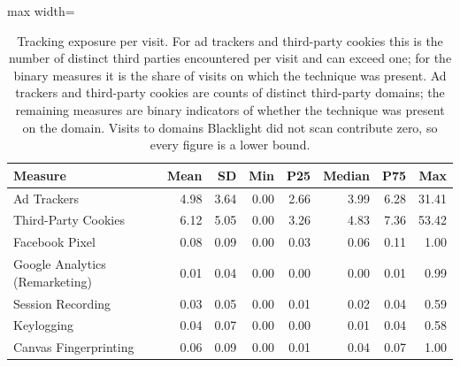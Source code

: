 \begin{table}[htbp]
\centering
\caption{Tracking exposure per visit. For ad trackers and third-party cookies this is the number of distinct third parties encountered per visit and can exceed one; for the binary measures it is the share of visits on which the technique was present. Ad trackers and third-party cookies are counts of distinct third-party domains; the remaining measures are binary indicators of whether the technique was present on the domain. Visits to domains Blacklight did not scan contribute zero, so every figure is a lower bound.}
\label{tab:exposure-rate}
\begin{adjustbox}{max width=\textwidth}
\begin{tabular}{lrrrrrrr}
\toprule
Measure & Mean & SD & Min & P25 & Median & P75 & Max \\
\midrule
Ad Trackers & 4.98 & 3.64 & 0.00 & 2.66 & 3.99 & 6.28 & 31.41 \\
Third-Party Cookies & 6.12 & 5.05 & 0.00 & 3.26 & 4.83 & 7.36 & 53.42 \\
Facebook Pixel & 0.08 & 0.09 & 0.00 & 0.03 & 0.06 & 0.11 & 1.00 \\
Google Analytics (Remarketing) & 0.01 & 0.04 & 0.00 & 0.00 & 0.00 & 0.01 & 0.99 \\
Session Recording & 0.03 & 0.05 & 0.00 & 0.01 & 0.02 & 0.04 & 0.59 \\
Keylogging & 0.04 & 0.07 & 0.00 & 0.00 & 0.01 & 0.04 & 0.58 \\
Canvas Fingerprinting & 0.06 & 0.09 & 0.00 & 0.01 & 0.04 & 0.07 & 1.00 \\
\bottomrule
\end{tabular}
\end{adjustbox}
\end{table}
